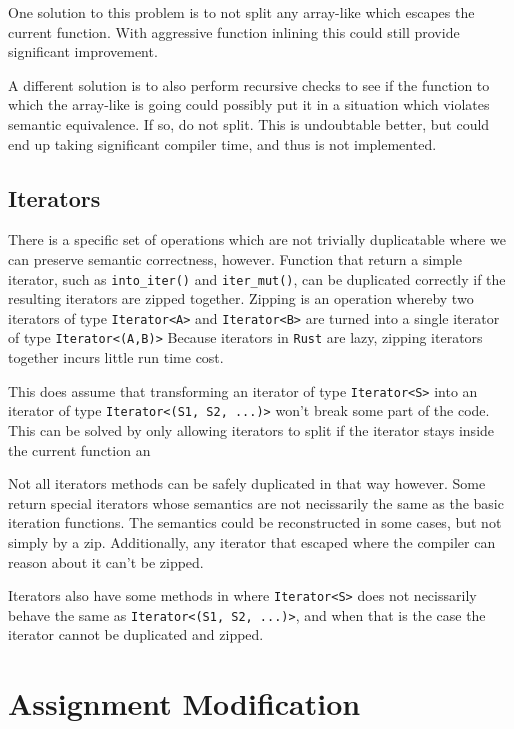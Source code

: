 \documentclass[12pt,oneside]{book}
\newcommand{\rustname}{{\texttt{Rust}}}
\def \rust {\rustname{}\xspace}
\begin{document}
One solution to this problem is
to not split any array-like which escapes the current function.
With aggressive function inlining this  could
still provide significant improvement.

A different solution is to also perform recursive checks to see 
if the function to which the array-like is going could possibly
put it in a situation which violates semantic equivalence. If 
so, do not split. This is undoubtable better, but could end up 
taking significant compiler time, and thus is not implemented. 

\subsection{Iterators}
There is a specific set of operations which are not trivially duplicatable
where we can preserve semantic correctness, however. 
Function that return a simple iterator, such as 
\texttt{into\_iter()} and \texttt{iter\_mut()}, can be duplicated correctly
if the resulting iterators are zipped together. 
Zipping is an operation whereby
two iterators of type \texttt{Iterator<A>} and \texttt{Iterator<B>}
are turned into a single iterator of type \texttt{Iterator<(A,B)>}
Because iterators in \rust are lazy, zipping iterators together incurs 
little run time cost.

This does assume that transforming an iterator of type \texttt{Iterator<S>}
into an iterator of type \texttt{Iterator<(S1, S2, ...)>} won't break 
some part of the code. This can be solved by only allowing iterators to 
split if the iterator stays inside the current function an

Not all iterators methods can be safely duplicated in that way however. 
Some return special iterators whose semantics are not necissarily
the same as the basic iteration functions. The semantics could be 
reconstructed in some cases, but not simply by a zip. Additionally,
any iterator that escaped where the compiler can reason about it
can't be zipped. 

Iterators also have some methods in where 
\texttt{Iterator<S>} does not necissarily behave the same as 
\texttt{Iterator<(S1, S2, ...)>}, and when that is the case the iterator
cannot be duplicated and zipped.

\section{Assignment Modification}
\label{sec:assign}
\end{document}
